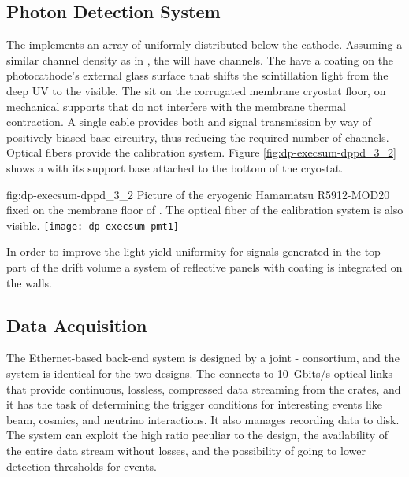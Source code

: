 \subsection{Photon Detection System}
\label{sec:dp-execsum-pd}

The  implements %
an array of  uniformly distributed below the cathode. Assuming a similar channel density as in , the  will have  \dpnumpmtch channels. The  have a  coating on the photocathode's external glass surface that shifts the scintillation light from the deep UV to the visible. The   sit on the corrugated membrane cryostat floor, on 
mechanical supports that do not interfere with the membrane thermal contraction. 
A single cable provides both  and signal transmission by way of positively biased base circuitry, thus reducing the required number of \fdth{} channels. Optical fibers provide the calibration system.   Figure \ref{fig:dp-execsum-dppd_3_2} shows a  with its support base attached to the bottom of the  cryostat.

\begin{dunefigure}{fig:dp-execsum-dppd_3_2}
{Picture of the cryogenic Hamamatsu R5912-MOD20  fixed on the membrane floor of . The optical fiber of the calibration system is also visible.}
\texttt{[image: dp-execsum-pmt1]}
\end{dunefigure}

In order to improve the light yield uniformity for signals generated in the top part of the drift volume a system of reflective panels with  coating is integrated on the   walls.


\subsection{Data Acquisition}
\label{sec:dp-execsum-daq}

The Ethernet-based  back-end system is designed by a joint - consortium, and the system is identical for the two  designs. The  connects to 
\SI{10}{Gbits/s} optical links that provide continuous, lossless, compressed data streaming from the  crates, and it has the task of determining the trigger conditions for interesting events like beam, cosmics, and  neutrino interactions. It also manages recording data to disk. The system can exploit the high  ratio peculiar to the  design, the availability of the entire data stream without losses, and the possibility of going to lower detection thresholds for  events.


